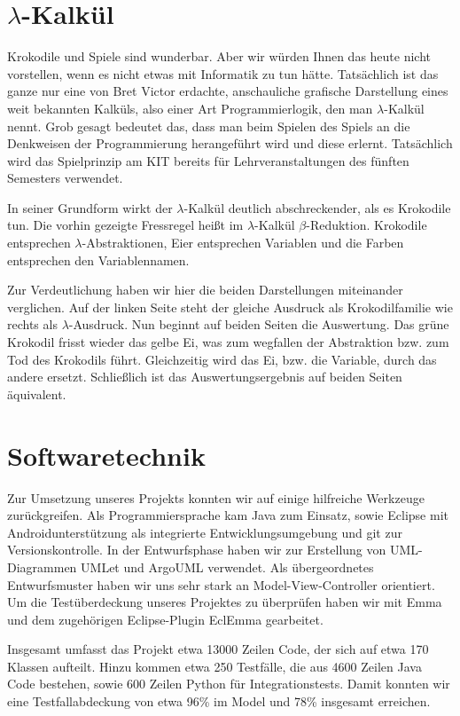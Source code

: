 \documentclass{scrartcl}
\begin{document}
	
	

	\section{$\lambda$-Kalkül}
	Krokodile und Spiele sind wunderbar.
	Aber wir würden Ihnen das heute nicht vorstellen, wenn es nicht etwas mit Informatik zu tun hätte.
	Tatsächlich ist das ganze nur eine von Bret Victor erdachte, anschauliche grafische Darstellung eines weit bekannten Kalküls, also einer Art Programmierlogik, den man $\lambda$-Kalkül nennt.
	Grob gesagt bedeutet das, dass man beim Spielen des Spiels an die Denkweisen der Programmierung herangeführt wird und diese erlernt.
	Tatsächlich wird das Spielprinzip am KIT bereits für Lehrveranstaltungen des fünften Semesters verwendet.

	In seiner Grundform wirkt der $\lambda$-Kalkül deutlich abschreckender, als es Krokodile tun.
	Die vorhin gezeigte Fressregel heißt im $\lambda$-Kalkül $\beta$-Reduktion.
	Krokodile entsprechen $\lambda$-Abstraktionen, Eier entsprechen Variablen und die Farben entsprechen den Variablennamen.

	Zur Verdeutlichung haben wir hier die beiden Darstellungen miteinander verglichen.
	Auf der linken Seite steht der gleiche Ausdruck als Krokodilfamilie wie rechts als $\lambda$-Ausdruck.
	Nun beginnt auf beiden Seiten die Auswertung.
	Das grüne Krokodil frisst wieder das gelbe Ei, was zum wegfallen der Abstraktion bzw. zum Tod des Krokodils führt.
	Gleichzeitig wird das Ei, bzw. die Variable, durch das andere ersetzt.
	Schließlich ist das Auswertungsergebnis auf beiden Seiten äquivalent.

	\section{Softwaretechnik}
	Zur Umsetzung unseres Projekts konnten wir auf einige hilfreiche Werkzeuge zurückgreifen.
	Als Programmiersprache kam Java zum Einsatz, sowie Eclipse mit Androidunterstützung als integrierte Entwicklungsumgebung und git zur Versionskontrolle.
	In der Entwurfsphase haben wir zur Erstellung von UML-Diagrammen UMLet und ArgoUML verwendet.
	Als übergeordnetes Entwurfsmuster haben wir uns sehr stark an Model-View-Controller orientiert.
	Um die Testüberdeckung unseres Projektes zu überprüfen haben wir mit Emma und dem zugehörigen Eclipse-Plugin EclEmma gearbeitet.

	Insgesamt umfasst das Projekt etwa 13000 Zeilen Code, der sich auf etwa 170 Klassen aufteilt.
	Hinzu kommen etwa 250 Testfälle, die aus 4600 Zeilen Java Code bestehen, sowie 600 Zeilen Python für Integrationstests.
	Damit konnten wir eine Testfallabdeckung von etwa 96\% im Model und 78\% insgesamt erreichen.
\end{document}
